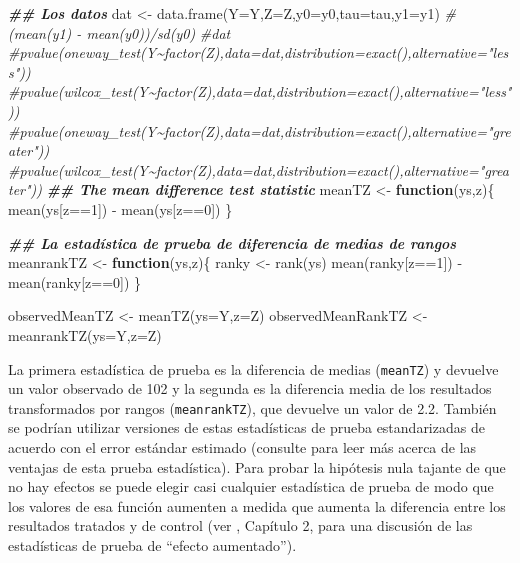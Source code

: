 \documentclass[
]{article}
\newenvironment{Shaded}{\begin{snugshade}}{\end{snugshade}}
\newcommand{\AttributeTok}[1]{\textcolor[rgb]{0.77,0.63,0.00}{#1}}
\newcommand{\CommentTok}[1]{\textcolor[rgb]{0.56,0.35,0.01}{\textit{#1}}}
\newcommand{\ControlFlowTok}[1]{\textcolor[rgb]{0.13,0.29,0.53}{\textbf{#1}}}
\newcommand{\DecValTok}[1]{\textcolor[rgb]{0.00,0.00,0.81}{#1}}
\newcommand{\DocumentationTok}[1]{\textcolor[rgb]{0.56,0.35,0.01}{\textbf{\textit{#1}}}}
\newcommand{\FunctionTok}[1]{\textcolor[rgb]{0.00,0.00,0.00}{#1}}
\newcommand{\NormalTok}[1]{#1}
\newcommand{\OtherTok}[1]{\textcolor[rgb]{0.56,0.35,0.01}{#1}}
\newcommand{\SpecialCharTok}[1]{\textcolor[rgb]{0.00,0.00,0.00}{#1}}
\begin{document}
\begin{Shaded}
\begin{Highlighting}[]
\DocumentationTok{\#\# Los datos}
\NormalTok{dat }\OtherTok{\textless{}{-}} \FunctionTok{data.frame}\NormalTok{(}\AttributeTok{Y=}\NormalTok{Y,}\AttributeTok{Z=}\NormalTok{Z,}\AttributeTok{y0=}\NormalTok{y0,}\AttributeTok{tau=}\NormalTok{tau,}\AttributeTok{y1=}\NormalTok{y1)}
\CommentTok{\#(mean(y1) {-} mean(y0))/sd(y0)}
\CommentTok{\#dat}
\CommentTok{\#pvalue(oneway\_test(Y\textasciitilde{}factor(Z),data=dat,distribution=exact(),alternative="less"))}
\CommentTok{\#pvalue(wilcox\_test(Y\textasciitilde{}factor(Z),data=dat,distribution=exact(),alternative="less"))}
\CommentTok{\#pvalue(oneway\_test(Y\textasciitilde{}factor(Z),data=dat,distribution=exact(),alternative="greater"))}
\CommentTok{\#pvalue(wilcox\_test(Y\textasciitilde{}factor(Z),data=dat,distribution=exact(),alternative="greater"))}
\DocumentationTok{\#\# The mean difference test statistic}
\NormalTok{meanTZ }\OtherTok{\textless{}{-}} \ControlFlowTok{function}\NormalTok{(ys,z)\{ }
    \FunctionTok{mean}\NormalTok{(ys[z}\SpecialCharTok{==}\DecValTok{1}\NormalTok{]) }\SpecialCharTok{{-}} \FunctionTok{mean}\NormalTok{(ys[z}\SpecialCharTok{==}\DecValTok{0}\NormalTok{])}
\NormalTok{\}}

\DocumentationTok{\#\# La estadística de prueba de diferencia de medias de rangos }
\NormalTok{meanrankTZ }\OtherTok{\textless{}{-}} \ControlFlowTok{function}\NormalTok{(ys,z)\{}
\NormalTok{    ranky }\OtherTok{\textless{}{-}} \FunctionTok{rank}\NormalTok{(ys)}
    \FunctionTok{mean}\NormalTok{(ranky[z}\SpecialCharTok{==}\DecValTok{1}\NormalTok{]) }\SpecialCharTok{{-}} \FunctionTok{mean}\NormalTok{(ranky[z}\SpecialCharTok{==}\DecValTok{0}\NormalTok{])}
\NormalTok{\}}

\NormalTok{observedMeanTZ }\OtherTok{\textless{}{-}} \FunctionTok{meanTZ}\NormalTok{(}\AttributeTok{ys=}\NormalTok{Y,}\AttributeTok{z=}\NormalTok{Z)}
\NormalTok{observedMeanRankTZ }\OtherTok{\textless{}{-}} \FunctionTok{meanrankTZ}\NormalTok{(}\AttributeTok{ys=}\NormalTok{Y,}\AttributeTok{z=}\NormalTok{Z)}
\end{Highlighting}
\end{Shaded}

La primera estadística de prueba es la diferencia de medias (\texttt{meanTZ}) y devuelve un valor observado de 102 y la segunda es la diferencia media de los resultados transformados por rangos (\texttt{meanrankTZ}), que devuelve un valor de 2.2. También se podrían utilizar versiones de estas estadísticas de prueba estandarizadas de acuerdo con el error estándar estimado (consulte \textcite{chung2013exact} para leer más acerca de las ventajas de esta prueba
estadística). Para probar la hipótesis nula tajante de que no hay efectos se puede elegir casi cualquier estadística de prueba de modo que los valores de esa función aumenten a medida que aumenta la diferencia entre los resultados tratados y de control (ver \textcite{rosenbaum2002}, Capítulo 2, para una discusión de las estadísticas de prueba de ``efecto aumentado'').
\end{document}
